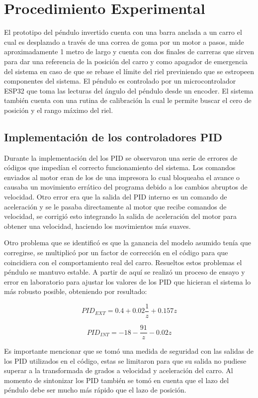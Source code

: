 \section{Procedimiento Experimental}

El prototipo del péndulo invertido cuenta con una barra anclada a un carro el cual es desplazado a través de una correa de goma por un motor a pasos, mide aproximadamente 1 metro de largo y cuenta con dos finales de carreras que sirven para dar una referencia de la posición del carro y como apagador de emergencia del sistema en caso de que se rebase el límite del riel previniendo que se estropeen componentes del sistema. El péndulo es controlado por un microcontrolador ESP32 que toma las lecturas del ángulo del péndulo desde un encoder. El sistema también cuenta con una rutina de calibración la cual le permite buscar el cero de posición y el rango máximo del riel.

\subsection{Implementación de los controladores PID}

Durante la implementación del los PID se observaron una serie de errores de códigos que impedían el correcto funcionamiento del sistema. Los comandos enviados al motor eran de los de una impresora lo cual bloqueaba el avance o causaba un movimiento errático del programa debido a los cambios abruptos de velocidad. Otro error era que la salida del PID interno es un comando de aceleración y se le pasaba directamente al motor que recibe comandos de velocidad, se corrigió esto integrando la salida de aceleración del motor para obtener una velocidad, haciendo los movimientos más suaves.

Otro problema que se identificó es que la ganancia del modelo asumido tenía que corregirse, se multiplicó por un factor de corrección en el código para que coincidiera con el comportamiento real del carro. Resueltos estos problemas el péndulo se mantuvo estable. A partir de aquí se realizó un proceso de ensayo y error en laboratorio para ajustar los valores de los PID que hicieran el sistema lo más robusto posible, obteniendo por resultado:

\[
PID_{EXT} = 0.4 + 0.02 \frac{1}{z} + 0.157 z
\]

\[
PID_{INT} = -18 - \frac{91}{z} - 0.02 z
\]

Es importante mencionar que se tomó una medida de seguridad con las salidas de los PID utilizados en el código, estas se limitaron para que su salida no pudiese superar a la transformada de grados a velocidad y aceleración del carro. Al momento de sintonizar los PID también se tomó en cuenta que el lazo del péndulo debe ser mucho más rápido que el lazo de posición.

